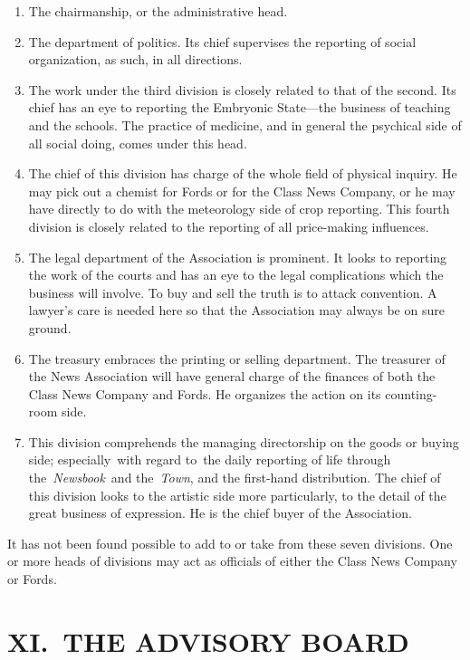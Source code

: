 \documentclass[twoside,symmetric,nobib,justified]{tufte-book}
\begin{document}
\begin{enumerate}
\item
  The chairmanship, or the administrative head.~~
\item
  The department of politics. Its chief supervises the reporting of
  social organization, as such, in all directions.~
\item
  The work under the third division is closely related to that of the
  second. Its chief has an eye to reporting the Embryonic State---the
  business of teaching and the schools. The practice of medicine, and in
  general the psychical side of all social doing, comes under this
  head.~
\item
  The chief of this division has charge of the whole field of physical
  inquiry. He may pick out a chemist for Fords or for the Class News
  Company, or he may have directly to do with the meteorology side of
  crop reporting. This fourth division is closely related to the
  reporting of all price-making influences.~
\item
  The legal department of the Association is prominent. It looks to
  reporting the work of the courts and has an eye to the legal
  complications which the business will involve. To buy and sell the
  truth is to attack convention. A lawyer's care is needed here so that
  the Association may always be on sure ground.~
\item
  The treasury embraces the printing or selling department. The
  treasurer of the News Association will have general charge of the
  finances of both the Class News Company and Fords. He organizes the
  action on its counting-room side.~
\item
  This division comprehends the managing directorship on the goods or
  buying side; especially~with regard to~the daily reporting of life
  through the~\emph{Newsbook}~and the~\emph{Town}, and the first-hand
  distribution. The chief of this division looks to the artistic side
  more particularly, to the detail of the great business of expression.
  He is the chief buyer of the Association.~
\end{enumerate}

It has not been found possible to add to or take from these seven
divisions. One or more heads of divisions may act as officials of either
the Class News Company or Fords.~~

\hypertarget{xi-the-advisory-board}{%
\section{XI.~THE ADVISORY BOARD}\label{xi-the-advisory-board}}
\end{document}
